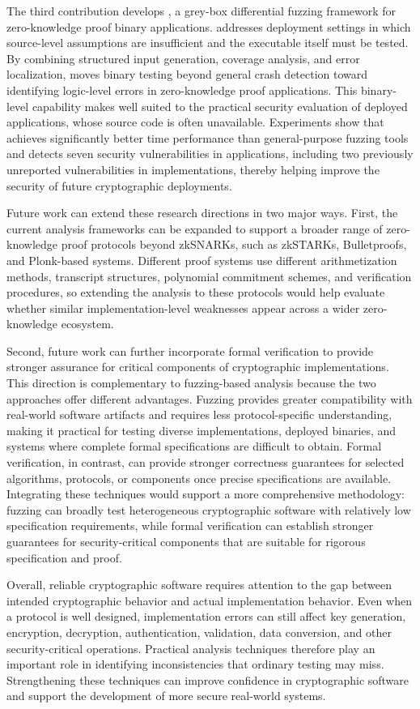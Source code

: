 The third contribution develops \greyboxfuzz, a grey-box differential fuzzing framework for zero-knowledge proof binary applications. \greyboxfuzz addresses deployment settings in which source-level assumptions are insufficient and the executable itself must be tested. By combining structured input generation, coverage analysis, and error localization, \greyboxfuzz moves binary testing beyond general crash detection toward identifying logic-level errors in zero-knowledge proof applications. This binary-level capability makes \greyboxfuzz well suited to the practical security evaluation of deployed \zkp applications, whose source code is often unavailable. Experiments show that \greyboxfuzz achieves significantly better time performance than general-purpose fuzzing tools and detects seven security vulnerabilities in \zksnark applications, including two previously unreported vulnerabilities in \zksnark implementations, thereby helping improve the security of future cryptographic deployments.

Future work can extend these research directions in two major ways. First, the current analysis frameworks can be expanded to support a broader range of zero-knowledge proof protocols beyond zkSNARKs, such as zkSTARKs, Bulletproofs, and Plonk-based systems. Different proof systems use different arithmetization methods, transcript structures, polynomial commitment schemes, and verification procedures, so extending the analysis to these protocols would help evaluate whether similar implementation-level weaknesses appear across a wider zero-knowledge ecosystem.

Second, future work can further incorporate formal verification to provide stronger assurance for critical components of cryptographic implementations. This direction is complementary to fuzzing-based analysis because the two approaches offer different advantages. Fuzzing provides greater compatibility with real-world software artifacts and requires less protocol-specific understanding, making it practical for testing diverse implementations, deployed binaries, and systems where complete formal specifications are difficult to obtain. Formal verification, in contrast, can provide stronger correctness guarantees for selected algorithms, protocols, or components once precise specifications are available. Integrating these techniques would support a more comprehensive methodology: fuzzing can broadly test heterogeneous cryptographic software with relatively low specification requirements, while formal verification can establish stronger guarantees for security-critical components that are suitable for rigorous specification and proof.

Overall, reliable cryptographic software requires attention to the gap between intended cryptographic behavior and actual implementation behavior. Even when a protocol is well designed, implementation errors can still affect key generation, encryption, decryption, authentication, validation, data conversion, and other security-critical operations. Practical analysis techniques therefore play an important role in identifying inconsistencies that ordinary testing may miss. Strengthening these techniques can improve confidence in cryptographic software and support the development of more secure real-world systems.